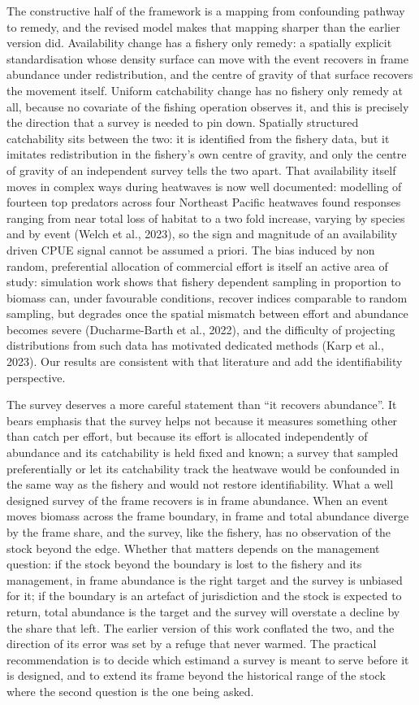 \documentclass[
  11pt,
  a4paper,
]{article}
\begin{document}
The constructive half of the framework is a mapping from confounding
pathway to remedy, and the revised model makes that mapping sharper than
the earlier version did. Availability change has a fishery only remedy:
a spatially explicit standardisation whose density surface can move with
the event recovers in frame abundance under redistribution, and the
centre of gravity of that surface recovers the movement itself. Uniform
catchability change has no fishery only remedy at all, because no
covariate of the fishing operation observes it, and this is precisely
the direction that a survey is needed to pin down. Spatially structured
catchability sits between the two: it is identified from the fishery
data, but it imitates redistribution in the fishery's own centre of
gravity, and only the centre of gravity of an independent survey tells
the two apart. That availability itself moves in complex ways during
heatwaves is now well documented: modelling of fourteen top predators
across four Northeast Pacific heatwaves found responses ranging from
near total loss of habitat to a two fold increase, varying by species
and by event (Welch et al., 2023), so the sign and magnitude of an
availability driven CPUE signal cannot be assumed a priori. The bias
induced by non random, preferential allocation of commercial effort is
itself an active area of study: simulation work shows that fishery
dependent sampling in proportion to biomass can, under favourable
conditions, recover indices comparable to random sampling, but degrades
once the spatial mismatch between effort and abundance becomes severe
(Ducharme-Barth et al., 2022), and the difficulty of projecting
distributions from such data has motivated dedicated methods (Karp et
al., 2023). Our results are consistent with that literature and add the
identifiability perspective.

The survey deserves a more careful statement than ``it recovers
abundance''. It bears emphasis that the survey helps not because it
measures something other than catch per effort, but because its effort
is allocated independently of abundance and its catchability is held
fixed and known; a survey that sampled preferentially or let its
catchability track the heatwave would be confounded in the same way as
the fishery and would not restore identifiability. What a well designed
survey of the frame recovers is in frame abundance. When an event moves
biomass across the frame boundary, in frame and total abundance diverge
by the frame share, and the survey, like the fishery, has no observation
of the stock beyond the edge. Whether that matters depends on the
management question: if the stock beyond the boundary is lost to the
fishery and its management, in frame abundance is the right target and
the survey is unbiased for it; if the boundary is an artefact of
jurisdiction and the stock is expected to return, total abundance is the
target and the survey will overstate a decline by the share that left.
The earlier version of this work conflated the two, and the direction of
its error was set by a refuge that never warmed. The practical
recommendation is to decide which estimand a survey is meant to serve
before it is designed, and to extend its frame beyond the historical
range of the stock where the second question is the one being asked.
\end{document}
